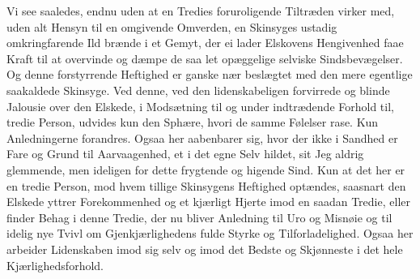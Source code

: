 \documentclass[12pt,a4paper]{book}
\newcommand{\apage}[1]{\marginnote{\footnotesize\textit{[#1]}}}
\begin{document}
\apage{122} Vi see saaledes, endnu uden at en Tredies foruroligende Tiltræden virker
med, uden alt Hensyn til en omgivende Omverden, en Skinsyges ustadig
omkringfarende Ild brænde i et Gemyt, der ei lader Elskovens
Hengivenhed faae Kraft til at overvinde og dæmpe de saa let opæggelige
selviske Sindsbevægelser. Og denne forstyrrende Heftighed er ganske nær
beslægtet med den mere egentlige saakaldede Skinsyge. Ved denne, ved den
lidenskabeligen forvirrede og blinde Jalousie over den Elskede, i
Modsætning til og under indtrædende Forhold til, tredie Person, udvides
kun den Sphære, hvori de samme Følelser rase. Kun Anledningerne
forandres. Ogsaa her aabenbarer sig, hvor der ikke i Sandhed er Fare og
Grund til Aarvaagenhed, et i det egne Selv hildet, sit Jeg aldrig
glemmende, men ideligen for dette frygtende og higende Sind. Kun at det
her er en tredie Person, mod hvem tillige Skinsygens Heftighed optændes,
saasnart den Elskede yttrer Forekommenhed og et kjærligt Hjerte imod en
saadan Tredie, eller finder Behag i denne Tredie, der nu bliver
Anledning til Uro og Misnøie og til idelig nye Tvivl om
Gjenkjærlighedens fulde Styrke og Tilforladelighed. Ogsaa her arbeider
Lidenskaben imod sig selv og imod det Bedste og Skjønneste i det hele
Kjærlighedsforhold.
\end{document}
